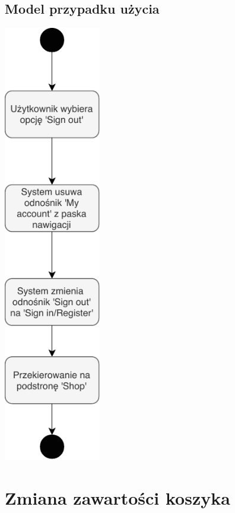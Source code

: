 \documentclass[12pt]{report}
\begin{document}
			\subsection{Model przypadku użycia}
			\begin{center}
				\includegraphics[width=120pt]{wylogowanie.pdf}
			\end{center}
			\newpage
		
		
	\section{Zmiana zawartości koszyka}
	
\end{document}
